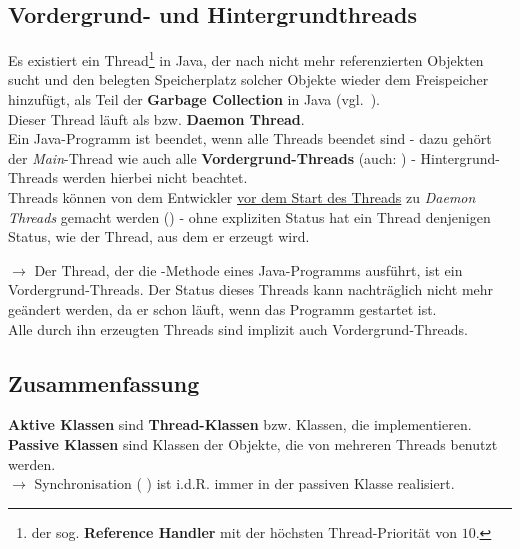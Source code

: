 \subsection{Vordergrund- und Hintergrundthreads}

Es existiert ein Thread\footnote{
der sog. \textbf{Reference Handler} mit der höchsten Thread-Priorität von $10$.
} in Java, der nach nicht mehr referenzierten Objekten sucht und den belegten Speicherplatz solcher Objekte wieder dem Freispeicher hinzufügt, als Teil der \textbf{Garbage Collection} in Java (vgl.~\cite[88]{Oec22}).\\
\noindent
Dieser Thread läuft als  bzw. \textbf{Daemon Thread}.\\

\noindent
Ein Java-Programm ist beendet, wenn alle Threads beendet sind - dazu gehört der \textit{Main}-Thread wie auch alle \textbf{Vordergrund-Threads} (auch: ) - Hintergrund-Threads werden hierbei nicht beachtet.\\

\noindent
Threads können von dem Entwickler \ul{vor dem Start des Threads} zu \textit{Daemon Threads} gemacht werden () - ohne expliziten Status hat ein Thread denjenigen Status, wie der Thread, aus dem er erzeugt wird.

\noindent
$\rightarrow$ Der Thread, der die -Methode eines Java-Programms ausführt, ist ein Vordergrund-Threads.
Der Status dieses Threads kann nachträglich nicht mehr geändert werden, da er schon läuft, wenn das Programm gestartet ist.\\
Alle durch ihn erzeugten Threads sind implizit auch Vordergrund-Threads.

\subsection{Zusammenfassung}

\textbf{Aktive Klassen} sind \textbf{Thread-Klassen} bzw. Klassen, die  implementieren.\\

\noindent
\textbf{Passive Klassen} sind Klassen der Objekte, die von mehreren Threads benutzt werden.\\

$\rightarrow$ Synchronisation ( ) ist i.d.R. immer in der passiven Klasse realisiert.